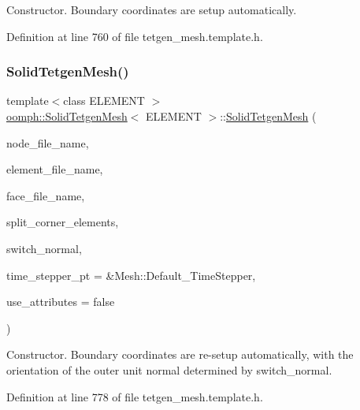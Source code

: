 Constructor. Boundary coordinates are setup automatically. 



Definition at line 760 of file tetgen\+\_\+mesh.\+template.\+h.

\mbox{\label{classoomph_1_1SolidTetgenMesh_a465c659e5bac66790a81f013bef23157}} 
\subsubsection{\texorpdfstring{Solid\+Tetgen\+Mesh()}{SolidTetgenMesh()}\hspace{0.1cm}{\footnotesize\ttfamily [2/2]}}
{\footnotesize\ttfamily template$<$class E\+L\+E\+M\+E\+NT $>$ \\
\hyperlink{classoomph_1_1SolidTetgenMesh}{oomph\+::\+Solid\+Tetgen\+Mesh}$<$ E\+L\+E\+M\+E\+NT $>$\+::\hyperlink{classoomph_1_1SolidTetgenMesh}{Solid\+Tetgen\+Mesh} (\begin{DoxyParamCaption}\item[{const std\+::string \&}]{node\+\_\+file\+\_\+name,  }\item[{const std\+::string \&}]{element\+\_\+file\+\_\+name,  }\item[{const std\+::string \&}]{face\+\_\+file\+\_\+name,  }\item[{const bool \&}]{split\+\_\+corner\+\_\+elements,  }\item[{const bool \&}]{switch\+\_\+normal,  }\item[{Time\+Stepper $\ast$}]{time\+\_\+stepper\+\_\+pt = {\ttfamily \&Mesh\+:\+:Default\+\_\+TimeStepper},  }\item[{const bool \&}]{use\+\_\+attributes = {\ttfamily false} }\end{DoxyParamCaption})\hspace{0.3cm}{\ttfamily [inline]}}



Constructor. Boundary coordinates are re-\/setup automatically, with the orientation of the outer unit normal determined by switch\+\_\+normal. 



Definition at line 778 of file tetgen\+\_\+mesh.\+template.\+h.

\mbox{\label{classoomph_1_1SolidTetgenMesh_afbd361be70e8d0f585a63cc300a26af7}} 

